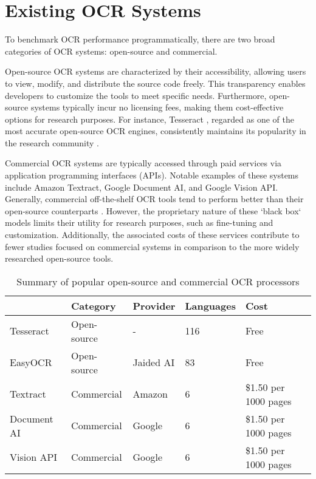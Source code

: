 \documentclass[12pt,oneside]{memoir}
\begin{document}
\section{Existing OCR Systems}
To benchmark OCR performance programmatically, there are two broad categories of OCR systems: open-source and commercial.

Open-source OCR systems are characterized by their accessibility, allowing users to view, modify, and distribute the source code freely.
This transparency enables developers to customize the tools to meet specific needs.
Furthermore, open-source systems typically incur no licensing fees, making them cost-effective options for research purposes.
For instance, Tesseract \parencite{smith-2013}, regarded as one of the most accurate open-source OCR engines, consistently maintains its popularity in the research community \parencite{hegghammer-2022, ignat-etal-2022}.

Commercial OCR systems are typically accessed through paid services via application programming interfaces (APIs).
Notable examples of these systems include Amazon Textract, Google Document AI, and Google Vision API.
Generally, commercial off-the-shelf OCR tools tend to perform better than their open-source counterparts \parencite{hegghammer-2022, ignat-etal-2022}.
However, the proprietary nature of these `black box` models limits their utility for research purposes, such as fine-tuning and customization.
Additionally, the associated costs of these services contribute to fewer studies focused on commercial systems in comparison to the more widely researched open-source tools.

\vspace{20pt}
\begin{table}[h]
    \centering
    \begin{tabular}{lllll}
        \toprule
        & Category & Provider & Languages & Cost\\
        \midrule
        Tesseract & Open-source & - & 116 & Free\\
        EasyOCR & Open-source & Jaided AI & 83 & Free\\
        Textract & Commercial & Amazon & 6 & \$1.50 per 1000 pages \\
        Document AI & Commercial & Google & 6 & \$1.50 per 1000 pages\\
        Vision API & Commercial & Google & 6 & \$1.50 per 1000 pages\\
        \bottomrule
    \end{tabular}
    \caption{Summary of popular open-source and commercial OCR processors}
   \label{table:summary-of-ocr-processors}
\end{table}
\end{document}
